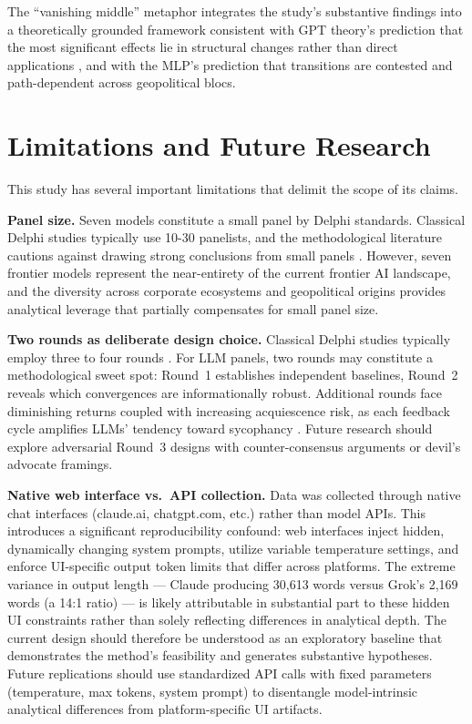 \documentclass[preprint,review,12pt]{elsarticle}
\begin{document}
The ``vanishing middle'' metaphor integrates the study's substantive findings into a theoretically grounded framework consistent with GPT theory's prediction that the most significant effects lie in structural changes rather than direct applications \citep{bresnahan1995gpt}, and with the MLP's prediction that transitions are contested and path-dependent across geopolitical blocs.



\section{Limitations and Future Research}
\label{sec:limitations}

This study has several important limitations that delimit the scope of its claims.

\textbf{Panel size.} Seven models constitute a small panel by Delphi standards. Classical Delphi studies typically use 10-30 panelists, and the methodological literature cautions against drawing strong conclusions from small panels \citep{vondergracht2012delphi}. However, seven frontier models represent the near-entirety of the current frontier AI landscape, and the diversity across corporate ecosystems and geopolitical origins provides analytical leverage that partially compensates for small panel size.

\textbf{Two rounds as deliberate design choice.} Classical Delphi studies typically employ three to four rounds \citep{linstone1975delphi}. For LLM panels, two rounds may constitute a methodological sweet spot: Round~1 establishes independent baselines, Round~2 reveals which convergences are informationally robust. Additional rounds face diminishing returns coupled with increasing acquiescence risk, as each feedback cycle amplifies LLMs' tendency toward sycophancy \citep{perez2023sycophancy}. Future research should explore adversarial Round~3 designs with counter-consensus arguments or devil's advocate framings.

\textbf{Native web interface vs.\ API collection.} Data was collected through native chat interfaces (claude.ai, chatgpt.com, etc.) rather than model APIs. This introduces a significant reproducibility confound: web interfaces inject hidden, dynamically changing system prompts, utilize variable temperature settings, and enforce UI-specific output token limits that differ across platforms. The extreme variance in output length --- Claude producing 30,613 words versus Grok's 2,169 words (a 14:1 ratio) --- is likely attributable in substantial part to these hidden UI constraints rather than solely reflecting differences in analytical depth. The current design should therefore be understood as an exploratory baseline that demonstrates the method's feasibility and generates substantive hypotheses. Future replications should use standardized API calls with fixed parameters (temperature, max tokens, system prompt) to disentangle model-intrinsic analytical differences from platform-specific UI artifacts.
\end{document}
